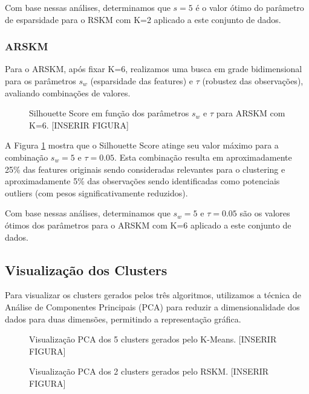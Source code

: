 \documentclass[conference]{IEEEtran}
\begin{document}
Com base nessas análises, determinamos que $s=5$ é o valor ótimo do parâmetro de esparsidade para o RSKM com K=2 aplicado a este conjunto de dados.

\subsubsection{ARSKM}
Para o ARSKM, após fixar K=6, realizamos uma busca em grade bidimensional para os parâmetros $s_w$ (esparsidade das features) e $\tau$ (robustez das observações), avaliando combinações de valores.

\begin{figure}[!t]
\centering
\caption{Silhouette Score em função dos parâmetros $s_w$ e $\tau$ para ARSKM com K=6. [INSERIR FIGURA]}
\label{fig:arskm_grid}
\end{figure}

A Figura \ref{fig:arskm_grid} mostra que o Silhouette Score atinge seu valor máximo para a combinação $s_w=5$ e $\tau=0.05$. Esta combinação resulta em aproximadamente 25\% das features originais sendo consideradas relevantes para o clustering e aproximadamente 5\% das observações sendo identificadas como potenciais outliers (com pesos significativamente reduzidos).

Com base nessas análises, determinamos que $s_w=5$ e $\tau=0.05$ são os valores ótimos dos parâmetros para o ARSKM com K=6 aplicado a este conjunto de dados.

\subsection{Visualização dos Clusters}
Para visualizar os clusters gerados pelos três algoritmos, utilizamos a técnica de Análise de Componentes Principais (PCA) para reduzir a dimensionalidade dos dados para duas dimensões, permitindo a representação gráfica.

\begin{figure}[!t]
\centering
\caption{Visualização PCA dos 5 clusters gerados pelo K-Means. [INSERIR FIGURA]}
\label{fig:kmeans_clusters}
\end{figure}

\begin{figure}[!t]
\centering
\caption{Visualização PCA dos 2 clusters gerados pelo RSKM. [INSERIR FIGURA]}
\label{fig:rskm_clusters}
\end{figure}
\end{document}
